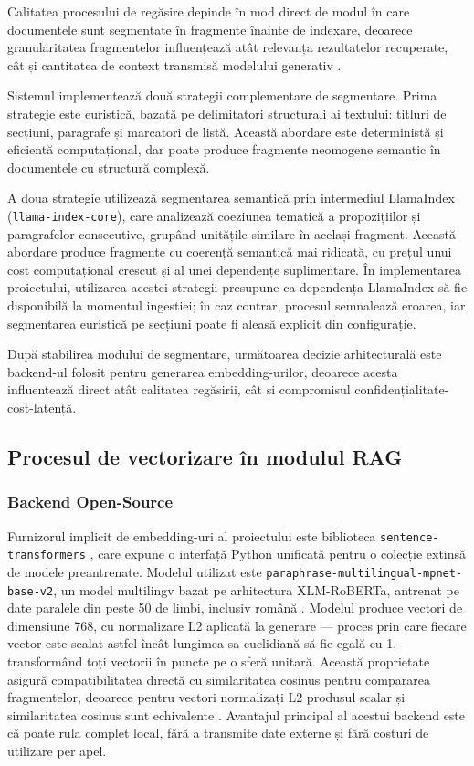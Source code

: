 \documentclass[12pt, a4paper, oneside, romanian]{teza-upb}
\begin{document}
Calitatea procesului de regăsire depinde în mod direct de modul în care documentele sunt segmentate în fragmente înainte de indexare, deoarece granularitatea fragmentelor influențează atât relevanța rezultatelor recuperate, cât și cantitatea de context transmisă modelului generativ \cite{gao2023retrieval}.

Sistemul implementează două strategii complementare de segmentare. Prima strategie este euristică, bazată pe delimitatori structurali ai textului: titluri de secțiuni, paragrafe și marcatori de listă. Această abordare este deterministă și eficientă computațional, dar poate produce fragmente neomogene semantic în documentele cu structură complexă.

A doua strategie utilizează segmentarea semantică prin intermediul LlamaIndex (\texttt{llama-index-core}), care analizează coeziunea tematică a propozițiilor și paragrafelor consecutive, grupând unitățile similare în același fragment. Această abordare produce fragmente cu coerență semantică mai ridicată, cu prețul unui cost computațional crescut și al unei dependențe suplimentare. În implementarea proiectului, utilizarea acestei strategii presupune ca dependența LlamaIndex să fie disponibilă la momentul ingestiei; în caz contrar, procesul semnalează eroarea, iar segmentarea euristică pe secțiuni poate fi aleasă explicit din configurație.

După stabilirea modului de segmentare, următoarea decizie arhitecturală este backend-ul folosit pentru generarea embedding-urilor, deoarece acesta influențează direct atât calitatea regăsirii, cât și compromisul confidențialitate-cost-latență.

\subsection{Procesul de vectorizare în modulul RAG}

\subsubsection{Backend Open-Source}

Furnizorul implicit de 
embedding-uri al proiectului este biblioteca \texttt{sentence-transformers} 
\cite{sentence_transformers_doc}, care expune o interfață Python unificată pentru 
o colecție extinsă de modele preantrenate. Modelul utilizat este 
\texttt{paraphrase-multilingual-mpnet-base-v2}, un model multilingv bazat pe 
arhitectura XLM-RoBERTa, antrenat pe date paralele din peste 50 de limbi, 
inclusiv română \cite{paraphrase_multilingual_mpnet}. Modelul produce vectori de dimensiune 768, cu normalizare L2 aplicată la 
generare — proces prin care fiecare vector este scalat astfel încât lungimea 
sa euclidiană să fie egală cu 1, transformând toți vectorii în puncte pe o 
sferă unitară. Această proprietate asigură compatibilitatea directă cu 
similaritatea cosinus pentru compararea fragmentelor, deoarece pentru vectori 
normalizați L2 produsul scalar și similaritatea cosinus sunt echivalente 
\cite{paraphrase_multilingual_mpnet}. Avantajul principal al acestui backend 
este că poate rula complet local, fără a transmite date externe și fără costuri 
de utilizare per apel.
\end{document}
